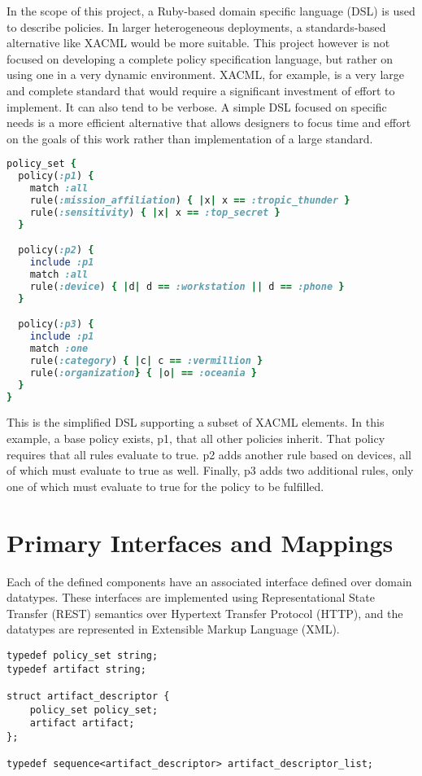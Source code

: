 In the scope of this project, a Ruby-based domain specific language (DSL) is used to describe policies.  In larger heterogeneous deployments, a standards-based alternative like XACML would be more suitable.  This project however is not focused on developing a complete policy specification language, but rather on using one in a very dynamic environment.  XACML, for example, is a very large and complete standard that would require a significant investment of effort to implement.  It can also tend to be verbose.  A simple DSL focused on  specific needs is a more efficient alternative that allows designers to focus time and effort on the goals of this work rather than implementation of a large standard.

\begin{lstlisting}[language=ruby, label=lst:policy-dsl, caption=Policy DSL Example]
policy_set {
  policy(:p1) {
    match :all
    rule(:mission_affiliation) { |x| x == :tropic_thunder }
    rule(:sensitivity) { |x| x == :top_secret }
  }

  policy(:p2) {
    include :p1
    match :all
    rule(:device) { |d| d == :workstation || d == :phone }
  }

  policy(:p3) {
    include :p1
    match :one
    rule(:category) { |c| c == :vermillion }
    rule(:organization} { |o| == :oceania }
  }
}
\end{lstlisting}

This is the simplified DSL supporting a subset of XACML elements.  In this example, a base policy exists, p1, that all other policies inherit.  That policy requires that all rules evaluate to true.  p2 adds another rule based on devices, all of which must evaluate to true as well.  Finally, p3 adds two additional rules, only one of which must evaluate to true for the policy to be fulfilled.

\section{Primary Interfaces and Mappings}
Each of the defined components have an associated interface defined over domain datatypes. These interfaces are implemented using Representational State Transfer (REST) semantics over Hypertext Transfer Protocol (HTTP), and the datatypes are represented in Extensible Markup Language (XML).

\begin{lstlisting}[language=idl, label=lst:artifact-data-types, caption=Key Artifact Dataypes]
typedef policy_set string;
typedef artifact string;

struct artifact_descriptor {
	policy_set policy_set;
	artifact artifact;
};

typedef sequence<artifact_descriptor> artifact_descriptor_list;
\end{lstlisting}

